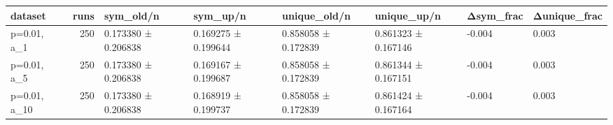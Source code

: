 \begin{tabular}{lrllllll}
\toprule
dataset & runs & sym_old/n & sym_up/n & unique_old/n & unique_up/n & Δsym_frac & Δunique_frac \\
\midrule
p=0.01, a_1 & 250 & 0.173380 ± 0.206838 & 0.169275 ± 0.199644 & 0.858058 ± 0.172839 & 0.861323 ± 0.167146 & -0.004 & 0.003 \\
p=0.01, a_5 & 250 & 0.173380 ± 0.206838 & 0.169167 ± 0.199687 & 0.858058 ± 0.172839 & 0.861344 ± 0.167151 & -0.004 & 0.003 \\
p=0.01, a_10 & 250 & 0.173380 ± 0.206838 & 0.168919 ± 0.199737 & 0.858058 ± 0.172839 & 0.861424 ± 0.167164 & -0.004 & 0.003 \\
\bottomrule
\end{tabular}
